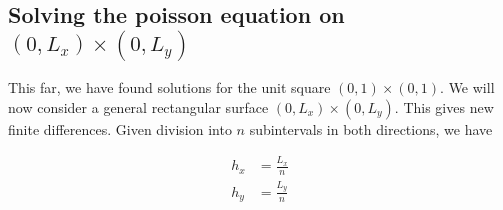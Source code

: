 
\subsection{Solving the poisson equation on $(0, L_x) \times (0,L_y)$}
This far, we have found solutions for the unit square $(0, 1) \times (0,1)$. We will now consider a general rectangular surface $(0, L_x) \times (0,L_y)$. This gives new finite differences. Given division into $n$ subintervals in both directions, we have






\begin{align}
h_x &= \frac{L_x}{n} \\
h_y &= \frac{L_y}{n}
\end{align}

